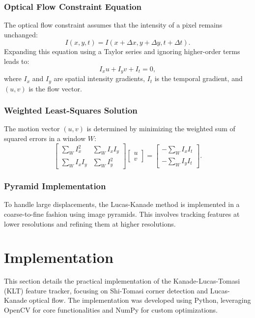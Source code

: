 \documentclass[11pt, conference, letterpaper]{IEEEtran}
\begin{document}
\subsubsection{Optical Flow Constraint Equation}
The optical flow constraint assumes that the intensity of a pixel remains unchanged:
\begin{equation}
I(x, y, t) = I(x + \Delta x, y + \Delta y, t + \Delta t).
\end{equation}
Expanding this equation using a Taylor series and ignoring higher-order terms leads to:
\begin{equation}
I_x u + I_y v + I_t = 0,
\end{equation}
where \(I_x\) and \(I_y\) are spatial intensity gradients, \(I_t\) is the temporal gradient, and \((u, v)\) is the flow vector.
\bigskip

\subsubsection{Weighted Least-Squares Solution}
The motion vector \((u, v)\) is determined by minimizing the weighted sum of squared errors in a window \(W\):
\begin{equation}
\begin{bmatrix}
\sum_W I_x^2 & \sum_W I_x I_y \\
\sum_W I_x I_y & \sum_W I_y^2
\end{bmatrix}
\begin{bmatrix}
u \\
v
\end{bmatrix}
=
\begin{bmatrix}
-\sum_W I_x I_t \\
-\sum_W I_y I_t
\end{bmatrix}.
\end{equation}
\bigskip

\subsubsection{Pyramid Implementation}
To handle large displacements, the Lucas-Kanade method is implemented in a coarse-to-fine fashion using image pyramids. This involves tracking features at lower resolutions and refining them at higher resolutions.


\section{Implementation}
This section details the practical implementation of the Kanade-Lucas-Tomasi (KLT) feature tracker, focusing on Shi-Tomasi corner detection and Lucas-Kanade optical flow. The implementation was developed using Python, leveraging OpenCV for core functionalities and NumPy for custom optimizations.
\end{document}
